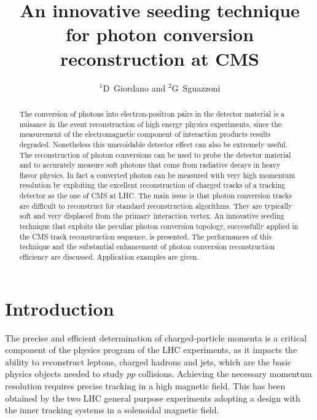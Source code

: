 \documentclass[a4paper]{jpconf}
\begin{document}
\title{An innovative seeding technique for photon conversion reconstruction at CMS}

\author{$^1$D~Giordano and $^2$G~Sguazzoni}

\address{$^1$CERN, Information Technology Department, Experiment Support Group, Geneva, Switzerland}
\address{$^2$INFN, Firenze, Italy}



\begin{abstract}
The conversion of photons into electron-positron pairs in the detector material is a nuisance in the event reconstruction of high energy physics experiments, since the measurement of the electromagnetic component of interaction products results degraded. Nonetheless this unavoidable detector effect can also be extremely useful. The reconstruction of photon conversions can be used to probe the detector material and to accurately measure soft photons that come from radiative decays in heavy flavor physics. In fact a converted photon can be measured with very high momentum resolution by exploiting the excellent reconstruction of charged tracks of a tracking detector as the one of CMS at LHC. The main issue is that photon conversion tracks are difficult to reconstruct for standard reconstruction algorithms. They are typically soft and very displaced from the primary interaction vertex. An innovative seeding technique that exploits the peculiar photon conversion topology, successfully applied in the CMS track reconstruction sequence, is presented. The performances of this technique and the substantial enhancement of photon conversion reconstruction efficiency are discussed. Application examples are given.
\end{abstract}


\section{Introduction}
\label{introductions}

The precise and efficient determination of charged-particle momenta is a
critical component of the physics program of the LHC experiments, 
as it impacts the ability to
reconstruct leptons, charged hadrons and jets, which
are the basic physics objects needed to study $pp$ collisions.
Achieving the necessary momentum resolution requires precise tracking in a high magnetic field. This has been obtained by  the two LHC general purpose experiments    adopting a design with the inner tracking systems in a solenoidal magnetic field.
\end{document}
